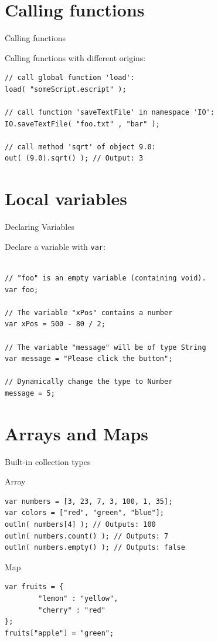\documentclass[ucs,9pt]{beamer}
\begin{document}

\section{Calling functions}
\begin{frame}[fragile]{Calling functions}
	\begin{block}{Calling functions with different origins:}
		\begin{lstlisting}
// call global function 'load':
load( "someScript.escript" );  

// call function 'saveTextFile' in namespace 'IO':
IO.saveTextFile( "foo.txt" , "bar" ); 

// call method 'sqrt' of object 9.0:
out( (9.0).sqrt() ); // Output: 3
		\end{lstlisting}
	\end{block}
\end{frame}
%

\section{Local variables}
\begin{frame}[fragile]{Declaring Variables}
	\begin{block}{Declare a variable with \lstinline!var!:}
		\begin{lstlisting}
			
// "foo" is an empty variable (containing void).
var foo; 

// The variable "xPos" contains a number
var xPos = 500 - 80 / 2;

// The variable "message" will be of type String
var message = "Please click the button";

// Dynamically change the type to Number
message = 5;
		\end{lstlisting}
	\end{block}
\end{frame}

\section{Arrays and Maps}
\begin{frame}[fragile]{Built-in collection types}
	\begin{block}{Array}
		\begin{lstlisting}
var numbers = [3, 23, 7, 3, 100, 1, 35];
var colors = ["red", "green", "blue"];
outln( numbers[4] ); // Outputs: 100
outln( numbers.count() ); // Outputs: 7
outln( numbers.empty() ); // Outputs: false
		\end{lstlisting}
	\end{block}
	\begin{block}{Map}
		\begin{lstlisting}
var fruits = {
		"lemon" : "yellow",
		"cherry" : "red"
};
fruits["apple"] = "green";
		\end{lstlisting}
	\end{block}
\end{frame}
\end{document}
